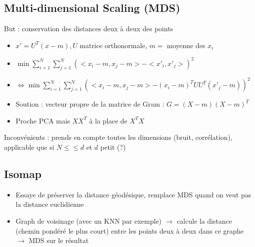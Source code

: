 \documentclass{article}
\theoremstyle{plain}%
\theoremstyle{definition}
\theoremstyle{remark}
\begin{document}
\subsection{Multi-dimensional Scaling (MDS)}
But : conservation des distances deux à deux des points
\begin{itemize}
    \item $ x' = U^T(x-m), U $ matrice orthonormale, $ m = $ moyenne des $ x_i $ 
    \item $ \min \sum_{i=1}^{N} \sum_{j=1}^{N} ( < x_i - m, x_j - m> - <x'_i , x'_j> )^2 $ 
    \item $\Leftrightarrow \min \sum_{i=1}^{N} \sum_{j=1}^{N} ( < x_i - m, x_j - m> - (x_i - m )^T U U^T (x'_j - m) )^2$ 
    \item Soution : vecteur propre de la matrice de Gram : $ G = (X - m)(X - m)^T $
    \item Proche PCA mais $ XX^T $ à la place de $ X^T X $ 
\end{itemize}
Inconvénients : prends en compte toutes les dimensions (bruit, corrélation), applicable que si $ N \leq \leq d $ et $ d $ petit (?)

\subsection{Isomap}
\begin{itemize}
    \item Essaye de préserver la distance géodésique, remplace MDS quand on veut pas la distance euclidienne
    \item Graph de voisinage (avec un KNN par exemple) $\rightarrow$ calcule la distance (chemin pondéré le plus court) entre les points deux à deux dans ce graphe $\rightarrow$ MDS sur le résultat
\end{itemize}
\end{document}
